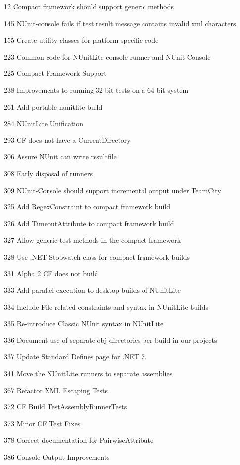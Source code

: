\begin{DoxyItemize}
\item 12 Compact framework should support generic methods
\item 145 N\+Unit-\/console fails if test result message contains invalid xml characters
\item 155 Create utility classes for platform-\/specific code
\item 223 Common code for N\+Unit\+Lite console runner and N\+Unit-\/\+Console
\item 225 Compact Framework Support
\item 238 Improvements to running 32 bit tests on a 64 bit system
\item 261 Add portable nunitlite build
\item 284 N\+Unit\+Lite Unification
\item 293 CF does not have a Current\+Directory
\item 306 Assure N\+Unit can write resultfile
\item 308 Early disposal of runners
\item 309 N\+Unit-\/\+Console should support incremental output under Team\+City
\item 325 Add Regex\+Constraint to compact framework build
\item 326 Add Timeout\+Attribute to compact framework build
\item 327 Allow generic test methods in the compact framework
\item 328 Use .N\+ET Stopwatch class for compact framework builds
\item 331 Alpha 2 CF does not build
\item 333 Add parallel execution to desktop builds of N\+Unit\+Lite
\item 334 Include File-\/related constraints and syntax in N\+Unit\+Lite builds
\item 335 Re-\/introduce \textquotesingle{}Classic\textquotesingle{} N\+Unit syntax in N\+Unit\+Lite
\item 336 Document use of separate obj directories per build in our projects
\item 337 Update Standard Defines page for .N\+ET 3.
\item 341 Move the N\+Unit\+Lite runners to separate assemblies
\item 367 Refactor X\+ML Escaping Tests
\item 372 CF Build Test\+Assembly\+Runner\+Tests
\item 373 Minor CF Test Fixes
\item 378 Correct documentation for Pairwise\+Attribute
\item 386 Console Output Improvements
\end{DoxyItemize}

